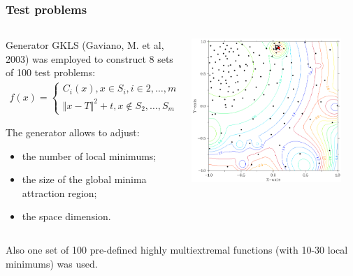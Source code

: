 \documentclass[aspectratio=1610]{beamer}
\begin{document}
\begin{frame}
  \frametitle{Test problems}
  \begin{columns}
    \begin{column}{0.5\textwidth}
      Generator GKLS (Gaviano, M. et al, 2003) was employed to construct 8 sets of 100 test problems:
      \begin{displaymath}
        \begin{matrix}
          f(x)=
          \left\{
          \begin{matrix}
          C_i(x), x \in S_i, i\in 2,\dots ,m \\
          \Vert x-T \Vert^2 + t, x\not\in S_2,\dots,S_m
          \end{matrix} \right.
        \end{matrix}
      \end{displaymath}

      The generator allows to adjust:
      \begin{itemize}
        \item the number of local minimums;
        \item the size of the global minima attraction region;
        \item the space dimension.
      \end{itemize}
    \end{column}
    \begin{column}{0.5\textwidth}
      \centerline{\includegraphics[width=0.9\textwidth]{gkls_color.png}}
    \end{column}
  \end{columns}
  Also one set of 100 pre-defined highly multiextremal functions (with 10-30 local minimums) was used.
\end{frame}
\end{document}
